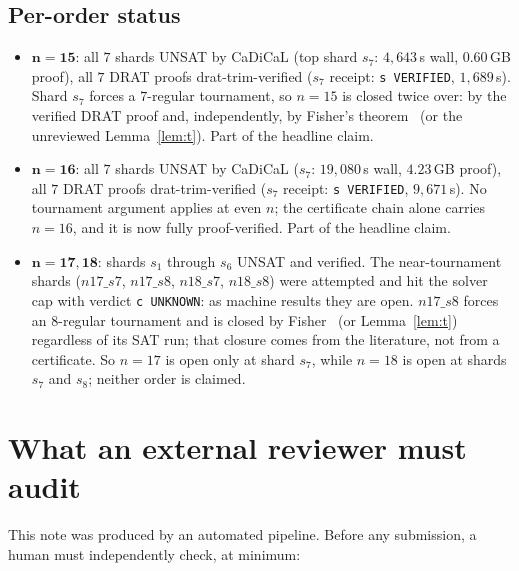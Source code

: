 \documentclass[11pt]{article}
\begin{document}
\subsection{Per-order status}\label{sec:beyond}

\begin{itemize}
\item $\mathbf{n = 15}$: all $7$ shards UNSAT by CaDiCaL (top shard
$s_7$: $4{,}643$\,s wall, $0.60$\,GB proof), all $7$ DRAT proofs
drat-trim-verified ($s_7$ receipt: \texttt{s VERIFIED}, $1{,}689$\,s).
Shard $s_7$ forces a $7$-regular tournament, so $n = 15$ is closed twice
over: by the verified DRAT proof and, independently, by Fisher's
theorem~\cite{Fisher96} (or the unreviewed Lemma~\ref{lem:t}). Part of
the headline claim.
\item $\mathbf{n = 16}$: all $7$ shards UNSAT by CaDiCaL ($s_7$:
$19{,}080$\,s wall, $4.23$\,GB proof), all $7$ DRAT proofs
drat-trim-verified ($s_7$ receipt: \texttt{s VERIFIED}, $9{,}671$\,s).
No tournament argument applies at even $n$; the certificate chain alone
carries $n = 16$, and it is now fully proof-verified. Part of the
headline claim.
\item $\mathbf{n = 17, 18}$: shards $s_1$ through $s_6$ UNSAT and
verified. The near-tournament shards ($n17\_s7$, $n17\_s8$, $n18\_s7$,
$n18\_s8$) were attempted and hit the solver cap with verdict
\texttt{c UNKNOWN}: as machine results they are open. $n17\_s8$ forces
an $8$-regular tournament and is closed by Fisher~\cite{Fisher96} (or
Lemma~\ref{lem:t}) regardless of its SAT run; that closure comes from the
literature, not from a certificate. So $n = 17$ is open only at shard
$s_7$, while $n = 18$ is open at shards $s_7$ and $s_8$; neither order
is claimed.
\end{itemize}

\section{What an external reviewer must audit}\label{sec:audit}

This note was produced by an automated pipeline. Before any submission, a
human must independently check, at minimum:
\end{document}
